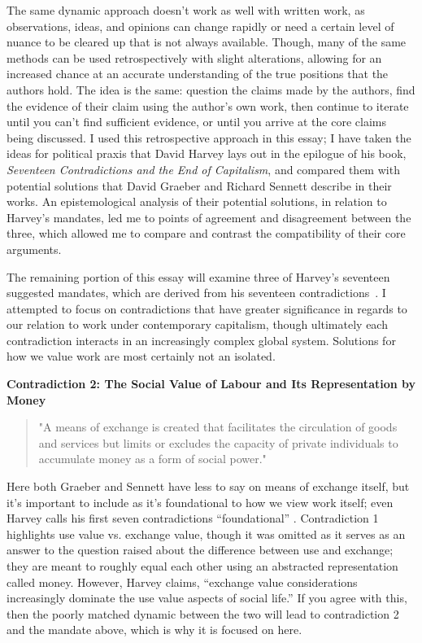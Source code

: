 \documentclass[12pt,a4paper]{article}
\begin{document}
The same dynamic approach doesn’t work as well with written work, as observations, ideas, and opinions can change rapidly or need a certain level of nuance to be cleared up that is not always available. Though, many of the same methods can be used retrospectively with slight alterations, allowing for an increased chance at an accurate understanding of the true positions that the authors hold. The idea is the same: question the claims made by the authors, find the evidence of their claim using the author's own work, then continue to iterate until you can’t find sufficient evidence, or until you arrive at the core claims being discussed. I used this retrospective approach in this essay; I have taken the ideas for political praxis that David Harvey lays out in the epilogue of his book, \textit{Seventeen Contradictions and the End of Capitalism}, and compared them with potential solutions that David Graeber and Richard Sennett describe in their works. An epistemological analysis of their potential solutions, in relation to Harvey’s mandates, led me to points of agreement and disagreement between the three, which allowed me to compare and contrast the compatibility of their core arguments. 
\vspace*{10pt}

The remaining portion of this essay will examine three of Harvey's seventeen suggested mandates, which are derived from his seventeen contradictions~\cite{con}. I attempted to focus on contradictions that have greater significance in regards to our relation to work under contemporary capitalism, though ultimately each contradiction interacts in an increasingly complex global system. Solutions for how we value work are most certainly not an isolated.

\textbf{Contradiction 2: The Social Value of Labour and Its Representation
by Money}
\begin{quotation} {\color{G-Moon}
    \noindent "A means of exchange is created that facilitates the circulation of goods and services but limits or excludes the capacity of private individuals to accumulate money as a form of social power." \cite{con}}
\end{quotation}
Here both Graeber and Sennett have less to say on means of exchange itself, but it’s important to include as it’s foundational to how we view work itself; even Harvey calls his first seven contradictions “foundational” \cite{con}. Contradiction 1 highlights use value vs. exchange value, though it was omitted as it serves as an answer to the question raised about the difference between use and exchange; they are meant to roughly equal each other using an abstracted representation called money. However, Harvey claims, “exchange value considerations increasingly dominate the use value aspects of social life.” \cite{con} If you agree with this, then the poorly matched dynamic between the two will lead to contradiction 2 and the mandate above, which is why it is focused on here.
\vspace*{10pt}
\end{document}
